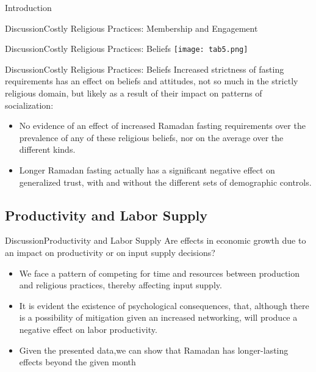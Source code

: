 \documentclass[pdftex,12pt,xcolor=pdftex,table]{beamer}
\begin{document}
\begin{frame}{Introduction}
\begin{frame}{Discussion}{Costly Religious Practices: Membership and Engagement}
\begin{itemize}
      \end{itemize}
    \end{frame}
    

    \begin{frame}{Discussion}{Costly Religious Practices: Beliefs}
    \vspace{-0.5cm}
    \centering\texttt{[image: tab5.png]}
    \end{frame}  


    \begin{frame}{Discussion}{Costly Religious Practices: Beliefs}
    Increased strictness of fasting requirements has an effect on beliefs and attitudes, not so much in the strictly religious domain, but likely as a result of their impact on patterns of socialization: 
    \begin{itemize}
        \item<2-> No evidence of an effect of increased Ramadan fasting requirements over the prevalence of any of these religious beliefs, nor on the average over the different kinds.
        \item<3-> Longer Ramadan fasting actually has a significant negative effect on generalized trust, with and without the different sets of demographic controls. 
        
      \end{itemize}
    \end{frame}

\subsection{Productivity and Labor Supply}
    \begin{frame}{Discussion}{Productivity and Labor Supply}
    Are effects in economic growth due to an impact on productivity or on input supply decisions?
    \begin{itemize}
        \item<2-> We face a pattern of competing for time and resources between production and religious practices, thereby affecting input supply.
        \item<3-> It is evident the existence of psychological consequences, that, although there is a possibility of mitigation given an increased networking, will produce a negative effect on labor productivity.
        \item<4-> Given the presented data,we can show that Ramadan has longer-lasting effects beyond the given month
    \end{itemize}
    \end{frame}
    

\end{frame}
\end{document}
